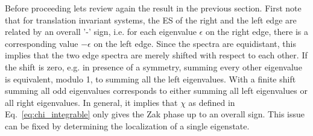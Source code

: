 \documentclass[twocolumn,amsmath,longbibliography,amssymb,superscriptaddress]{revtex4-1}
\begin{document}
Before proceeding lets review again the result in the previous section. First note that for translation invariant systems, the ES of the right and the left edge are related by an overall '-' sign, i.e. for each eigenvalue $\epsilon$ on the right edge, there is a corresponding value $-\epsilon$ on the left edge. 
Since the spectra are equidistant, this implies that the two edge spectra are merely shifted with respect to each other.
If the shift is zero, e.g.  in presence of a symmetry, summing every other eigenvalue is equivalent, modulo 1, to summing all the left eigenvalues. With a finite shift summing all odd eigenvalues corresponds to either summing all left eigenvalues or all right eigenvalues. In general, it implies that $\chi$ as defined in Eq.~\eqref{eq:chi_integrable} only gives the Zak phase up to an overall sign. This issue can be fixed by determining the localization of a single eigenstate. 
\end{document}
